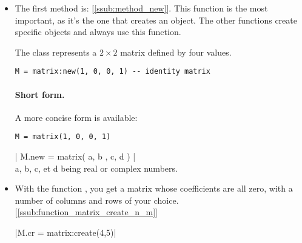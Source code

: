 \begin{itemize}

\item  The first method is: [\ref{ssub:method_new}]. This function is the most important, as it's the one that creates an object. The other functions create specific objects and always use this function.

The  class represents a $2\times2$ matrix defined by four values.

\begin{mybox}
\begin{verbatim}
M = matrix:new(1, 0, 0, 1) -- identity matrix
\end{verbatim}
\end{mybox}

\paragraph{Short form.}
A more concise form is available:

\begin{mybox}
\begin{verbatim}
M = matrix(1, 0, 0, 1)
\end{verbatim}
\end{mybox}


\begin{mybox}
   | M.new = matrix({ { a, b }, { c, d } }) | \\
   a, b, c, et d being real or complex numbers.
\end{mybox}

\begin{minipage}{.3\textwidth}
\end{minipage}
\begin{minipage}{.6\textwidth}
\begin{tkzexample}
\end{tkzexample}
\end{minipage}


\item With the function , you get a matrix whose coefficients are all zero, with a number of columns and rows of your choice. [\ref{ssub:function_matrix_create_n_m}]

  \begin{mybox}
  |M.cr = matrix:create(4,5)|
  \end{mybox}


\end{itemize}
